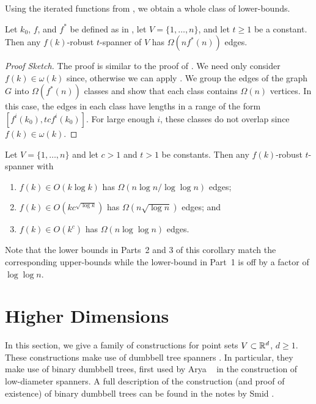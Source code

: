 \documentclass{patmorin}
\begin{document}
Using the iterated functions from , we obtain a whole
class of lower-bounds.

\begin{thm}
  Let $k_0$, $f$, and $f^*$ be defined as in ,
  let $V=\{1,\ldots,n\}$, and let $t\ge 1$ be a constant.  Then any
  $f(k)$-robust $t$-spanner of $V$ has $\Omega(nf^*(n))$ edges.
\end{thm}

\begin{proof}[Proof Sketch]
  The proof is similar to the proof of .
  We need only consider $f(k)\in\omega(k)$ since, otherwise we can apply
  .  We group the edges of the graph
  $G$ into $\Omega(f^*(n))$ classes and show that each class contains
  $\Omega(n)$ vertices.  In this case, the edges in each class have
  lengths in a range of the form $[f^i(k_0),tcf^{i}(k_0)]$.  For large
  enough $i$, these classes do not overlap since $f(k)\in\omega(k)$.
\end{proof}

\begin{cor}
  Let $V=\{1,\ldots,n\}$ and let $c>1$ and $t>1$ be constants.  Then any
  $f(k)$-robust $t$-spanner with
  \begin{enumerate}
    \item $f(k)\in O(k\log k)$ has $\Omega(n\log n/\log\log n)$ edges;
    \item $f(k)\in O(kc^{\sqrt{\log k}})$ has $\Omega(n\sqrt{\log n})$
      edges; and
    \item $f(k)\in O(k^{c})$ has $\Omega(n\log\log n)$ edges.
  \end{enumerate}
\end{cor}

Note that the lower bounds in Parts~2 and 3 of this corollary match the
corresponding upper-bounds while the lower-bound in Part~1 is off by a
factor of $\log\log n$.


\section{Higher Dimensions}

In this section, we give a family of constructions for point sets
$V\subset\mathbb{R}^d$, $d\ge 1$.  These constructions make use of dumbbell
tree spanners \cite[Chapter~11]{ns07}.  In particular, they make use
of binary dumbbell trees, first used by Arya \etal\ \cite{admss95} in
the construction of low-diameter spanners.  A full description of the
construction (and proof of existence) of binary dumbbell trees can be
found in the notes by Smid \cite{s12}.
\end{document}
